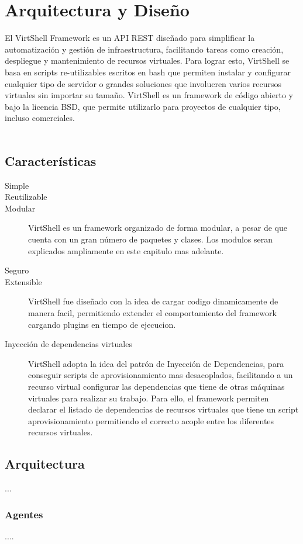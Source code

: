 \chapter{Arquitectura y Diseño}
\label{Arquitectura}

El VirtShell Framework es un API REST diseñado para simplificar la automatización y gestión de infraestructura, facilitando tareas como creación, despliegue y mantenimiento de recursos virtuales. Para lograr esto, VirtShell se basa en scripts re-utilizables escritos en bash que permiten instalar y configurar cualquier tipo de servidor o grandes soluciones que involucren varios recursos virtuales sin importar su tamaño. VirtShell es un framework de código abierto y bajo la licencia BSD, que permite utilizarlo para proyectos de cualquier tipo, incluso comerciales. \\
\\
\section{Características}

\begin{description}
\item [Simple]
\item [Reutilizable]
\item [Modular] VirtShell es un framework organizado de forma modular, a pesar de que cuenta con un gran número de paquetes y clases. Los modulos seran explicados ampliamente en este capitulo mas adelante.
\item [Seguro] 
\item [Extensible] VirtShell fue diseñado con la idea de cargar codigo dinamicamente de manera facil, permitiendo extender el comportamiento del framework cargando plugins en tiempo de ejecucion.
\item [Inyección de dependencias virtuales] VirtShell adopta la idea del patrón de Inyección de Dependencias, para conseguir scripts de aprovisionamiento mas desacoplados, facilitando a un recurso virtual configurar las dependencias que tiene de otras máquinas virtuales para realizar su trabajo. Para ello, el framework permiten declarar el listado de dependencias de recursos virtuales que tiene un script aprovisionamiento permitiendo el correcto acople entre los diferentes recursos virtuales. 
\end{description}

\section{Arquitectura}
...

\subsection{Agentes}
....

